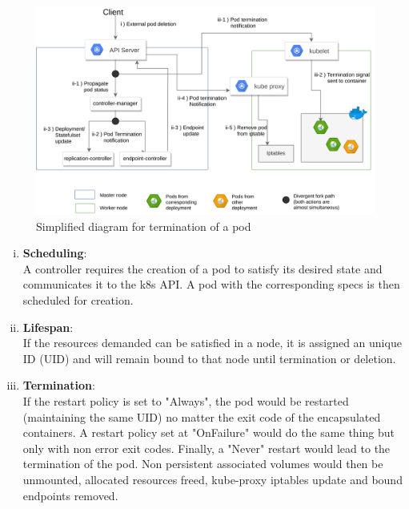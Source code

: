 \documentclass[11pt]{article}
\begin{document}
\begin{figure}[h]
    \centering
    \includegraphics[width=\textwidth]{k8s_lifecycle.png}
    \caption{Simplified diagram for termination of a pod}
    \label{fig:pod_end}
\end{figure}

\begin{enumerate}[i)]
    \item \textbf{Scheduling}: \\[0.1cm] A controller requires the creation of a pod to satisfy its desired state and communicates it to the k8s API. A pod with the corresponding specs is then scheduled for creation.
    
    \vspace{1mm}
    \item \textbf{Lifespan}: \\[0.1cm] If the resources demanded can be satisfied in a node, it is assigned an unique ID (UID) and will remain bound to that node until termination or deletion. 
    
    \vspace{1mm}
    \item \textbf{Termination}: \\[0.1cm]  If the restart policy is set to "Always", the pod would be restarted (maintaining the same UID) no matter the exit code of the encapsulated containers. A restart policy set at "OnFailure" would do the same thing but only with non error exit codes. Finally, a "Never" restart would lead to the termination of the pod. Non persistent associated volumes would then be unmounted, allocated resources freed, kube-proxy iptables update and bound endpoints removed.
\end{enumerate}
\end{document}
